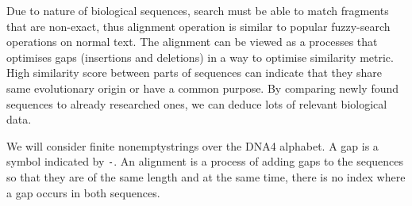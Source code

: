 Due to nature of biological sequences, search must be able to match fragments that are non-exact, thus alignment operation is similar to popular fuzzy-search operations on normal text.
The alignment can be viewed as a processes that optimises gaps (insertions and deletions) in a way to optimise similarity metric. High similarity score between parts of sequences can indicate that they share same evolutionary origin or have a common purpose. By comparing newly found sequences to already researched ones, we can deduce lots of relevant biological data. \cite{zpp_bio}

We will consider finite nonemptystrings over the DNA4 alphabet. A gap is a symbol indicated by \texttt{-}. An alignment is a process of adding gaps to the sequences so that they are of the same length and at the same time, there is no index where a gap occurs in both sequences.

